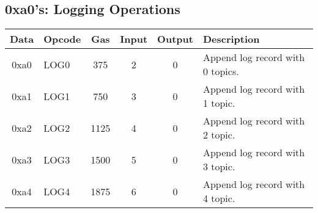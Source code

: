 \documentclass[10pt,a4paper,leqno,bibliography=totoc]{scrartcl}
\newenvironment{alphafootnotes}
{\par\edef\savedfootnotenumber{\number\value{footnote}}
\renewcommand{\thefootnote}{\alph{footnote}}
\setcounter{footnote}{0}}
{\par\setcounter{footnote}{\savedfootnotenumber}}
\begin{document}
\begin{alphafootnotes}
		\subsection{0xa0's: Logging Operations}
			\begin{longtable}{|cP{2.8cm}cccp{6cm}|}
		        \hline  
		        \textbf{Data} & \textbf{Opcode} & \textbf{Gas}  & \textbf{Input}  & \textbf{Output} & \textbf{Description} \\
		        \hline  
			0xa0 & LOG0 & 375 & 2 & 0 & Append log record with 0 topics. \\
			0xa1 & LOG1 & 750 & 3 & 0 & Append log record with 1 topic. \\
			0xa2 & LOG2 & 1125 & 4 & 0 & Append log record with 2 topic. \\
			0xa3 & LOG3 & 1500 & 5 & 0 & Append log record with 3 topic. \\
			0xa4 & LOG4 & 1875 & 6 & 0 & Append log record with 4 topic. \\
			\hline
			\end{longtable}


\end{alphafootnotes}
\end{document}
